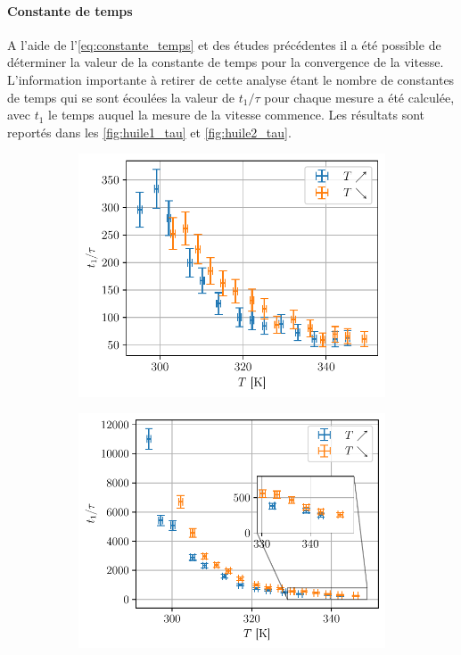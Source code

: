 \paragraph{Constante de temps} A l'aide de l'\autoref{eq:constante_temps} et des études précédentes il a été possible de déterminer la valeur de la constante de temps pour la convergence de la vitesse. L'information importante à retirer de cette analyse étant le nombre de constantes de temps qui se sont écoulées la valeur de $t_1/\tau$ pour chaque mesure a été calculée, avec $t_1$ le temps auquel la mesure de la vitesse commence. Les résultats sont reportés dans les \autoref{fig:huile1_tau} et \autoref{fig:huile2_tau}.
\begin{figure}[H]
    \centering
    \begin{subfigure}{0.48\linewidth}
        \centering
        \includegraphics[width=\linewidth]{figures/huile1_tau.pdf}
        \caption{}
        \label{fig:huile1_tau}
    \end{subfigure}
    \begin{subfigure}{0.48\linewidth}
        \centering
        \includegraphics[width=\linewidth]{figures/huile2_tau.pdf}

\end{subfigure}
\end{figure}
